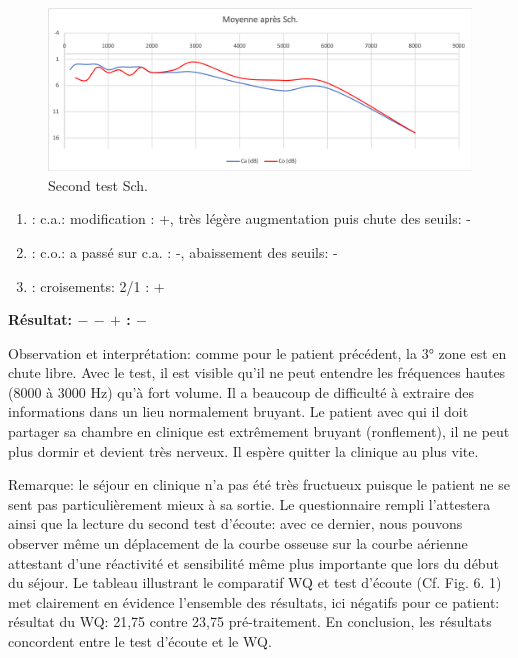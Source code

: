          \begin{figure}[th]
\centering
\includegraphics[width=1\linewidth]{images/graphiques/schaff_post.png}
\caption[Patient Sch.: 2° test]{Second test Sch.}

\end{figure}


\begin{enumerate}
	
	\item : c.a.:  modification : +, très légère augmentation puis chute des
	seuils: -
	\item : c.o.: a passé sur c.a. : -, abaissement des seuils:  -
	\item : croisements: 2/1 :     +
\end{enumerate}
\textbf{ Résultat:  $-$    $-$   $+$         :   $-$ }


Observation et interprétation: comme pour le patient précédent, la 3° zone est en chute libre. Avec le 
test, il est visible qu'il ne peut entendre les fréquences hautes (8000 à 3000 Hz) qu'à fort volume.  Il a  
beaucoup de difficulté à extraire des informations dans un 
lieu normalement bruyant. Le patient avec qui il doit partager sa chambre en clinique est extrêmement 
bruyant 
(ronflement), il ne peut plus dormir et devient très nerveux. Il espère quitter la clinique au plus 
vite.


Remarque: le séjour en clinique n'a pas été très fructueux puisque le patient ne se sent pas 
particulièrement mieux à sa sortie. Le questionnaire rempli l'attestera ainsi que la lecture du second test 
d'écoute: avec ce dernier, nous pouvons observer même un déplacement de la courbe osseuse sur la 
courbe aérienne attestant d'une réactivité et sensibilité même plus importante que lors du début du 
séjour. Le tableau illustrant le  comparatif WQ et test d'écoute (Cf. Fig. 6. 1)  met clairement en évidence 
l'ensemble des 
résultats, ici négatifs pour ce patient: résultat du WQ: 21,75 contre 23,75 pré-traitement.
En conclusion, les résultats concordent entre le test d'écoute et le WQ.
 \clearpage

